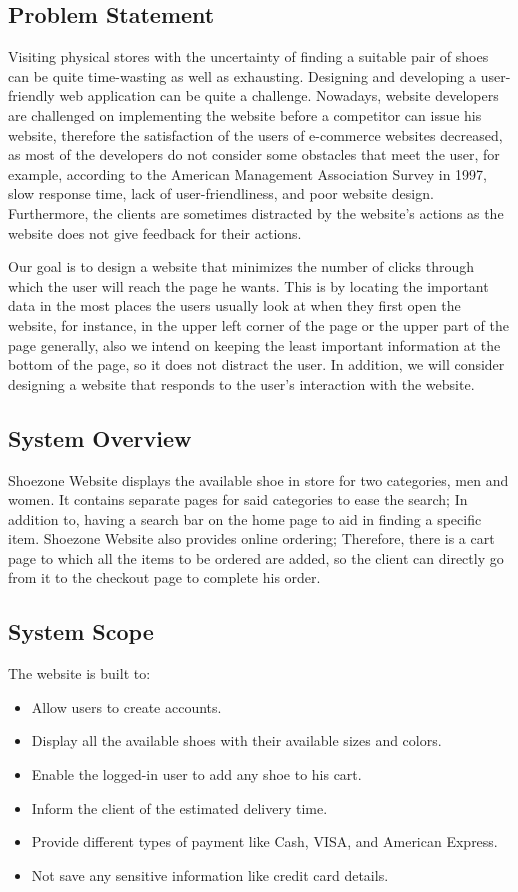 \documentclass[12pt]{article}
\begin{document}
\subsection{Problem Statement}
Visiting physical stores with the uncertainty of finding a suitable pair of shoes can be quite time-wasting as well as exhausting. Designing and developing a user-friendly web application can be quite a challenge. Nowadays, website developers are challenged on implementing the website before a competitor can issue his website, therefore the satisfaction of the users of e-commerce websites decreased, as most of the developers do not consider some obstacles that meet the user, for example, according to the American Management Association Survey in 1997, slow response time, lack of user-friendliness, and poor website design. Furthermore, the clients are sometimes distracted by the website’s actions as the website does not give feedback for their actions.

Our goal is to design a website that minimizes the number of clicks through which the user will reach the page he wants. This is by locating the important data in the most places the users usually look at when they first open the website, for instance, in the upper left corner of the page or the upper part of the page generally, also we intend on keeping the least important information at the bottom of the page, so it does not distract the user. In addition, we will consider designing a website that responds to the user’s interaction with the website.


\subsection{System Overview}
Shoezone Website displays the available shoe in store for two categories, men and women. It contains separate pages for said categories to ease the search; In addition to, having a search bar on the home page to aid in finding a specific item. Shoezone Website also provides online ordering; Therefore, there is a cart page to which all the items to be ordered are added, so the client can directly go from it to the checkout page to complete his order.

\subsection{System Scope}
The website is built to:
\begin{itemize}
 \item Allow users to create accounts.
 \item Display all the available shoes with their available sizes and colors.
 \item Enable the logged-in user to add any shoe to his cart.
 \item Inform the client of the estimated delivery time.
 \item Provide different types of payment like Cash, VISA, and American Express.   
 \item Not save any sensitive information like credit card details.
\end{itemize}
\newpage
\end{document}
